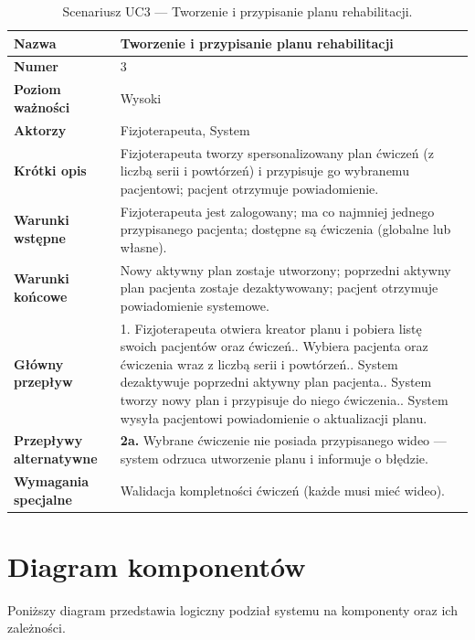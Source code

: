 \documentclass[11pt,a4paper]{article}
\begin{document}
\begin{table}[ht]
\small
\renewcommand{\arraystretch}{1.25}
\begin{tabularx}{\textwidth}{|>{\bfseries}p{}|Y|}
\hline
Nazwa & Tworzenie i przypisanie planu rehabilitacji \\ \hline
Numer & 3 \\ \hline
Poziom ważności & Wysoki \\ \hline
Aktorzy & Fizjoterapeuta, System \\ \hline
Krótki opis & Fizjoterapeuta tworzy spersonalizowany plan ćwiczeń (z liczbą serii i powtórzeń) i przypisuje go wybranemu pacjentowi; pacjent otrzymuje powiadomienie. \\ \hline
Warunki wstępne & Fizjoterapeuta jest zalogowany; ma co najmniej jednego przypisanego pacjenta; dostępne są ćwiczenia (globalne lub własne). \\ \hline
Warunki końcowe & Nowy aktywny plan zostaje utworzony; poprzedni aktywny plan pacjenta zostaje dezaktywowany; pacjent otrzymuje powiadomienie systemowe. \\ \hline
Główny przepływ & 1. Fizjoterapeuta otwiera kreator planu i pobiera listę swoich pacjentów oraz ćwiczeń.. Wybiera pacjenta oraz ćwiczenia wraz z liczbą serii i powtórzeń.. System dezaktywuje poprzedni aktywny plan pacjenta.. System tworzy nowy plan i przypisuje do niego ćwiczenia.. System wysyła pacjentowi powiadomienie o aktualizacji planu. \\ \hline
Przepływy alternatywne & \textbf{2a.} Wybrane ćwiczenie nie posiada przypisanego wideo — system odrzuca utworzenie planu i informuje o błędzie. \\ \hline
Wymagania specjalne & Walidacja kompletności ćwiczeń (każde musi mieć wideo). \\ \hline
\end{tabularx}
\caption{Scenariusz UC3 — Tworzenie i przypisanie planu rehabilitacji.}
\end{table}
\FloatBarrier

\FloatBarrier
\section{Diagram komponentów}
Poniższy diagram przedstawia logiczny podział systemu na komponenty oraz ich zależności.
\end{document}
